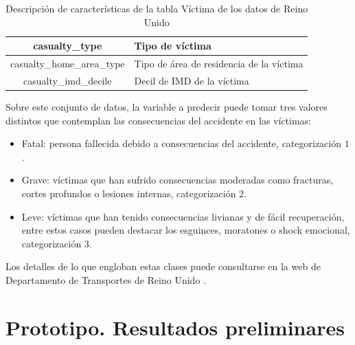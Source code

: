 \begin{table}[H]
\begin{center}
\begin{tabular}{|c|l|}
			casualty\_type & Tipo de víctima \\ \hline
			casualty\_home\_area\_type & Tipo de área de residencia de la víctima \\ \hline
			casualty\_imd\_decile & Decil de IMD de la víctima \\ \hline
		\end{tabular}
	\end{center}
	\caption{Descripción de características de la tabla Víctima de los datos de Reino Unido}
	\label{UK_CASUALTY_TABLE}
\end{table}

Sobre este conjunto de datos, la variable a predecir puede tomar tres valores distintos que contemplan las consecuencias del accidente en las víctimas:

\begin{itemize}
	\item Fatal: persona fallecida debido a consecuencias del accidente, categorización $1$.
	\item Grave: víctimas que han sufrido consecuencias moderadas como fracturas, cortes profundos o lesiones internas, categorización $2$.
	\item Leve: víctimas que han tenido consecuencias livianas y de fácil recuperación, entre estos casos pueden destacar los esguinces, moratones o shock emocional, categorización $3$.
\end{itemize}

Los detalles de lo que engloban estas clases puede consultarse en la web de Departamento de Transportes de Reino Unido \cite{UKDepartmentSeverityDefinition}.


\section{Prototipo. Resultados preliminares}




